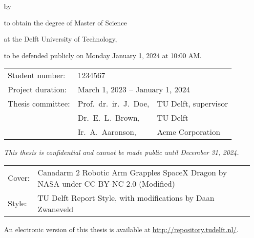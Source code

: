 \begin{titlepage}

\begin{center}

{\makeatletter
\largetitlestyle\fontsize{45}{45}\selectfont\@title
\makeatother}

{\makeatletter
\ifdefvoid{\@subtitle}{}{\bigskip\titlestyle\fontsize{20}{20}\selectfont\@subtitle}
\makeatother}

\bigskip
\bigskip

by

\bigskip
\bigskip

{\makeatletter
\largetitlestyle\fontsize{25}{25}\selectfont\@author
\makeatother}

\bigskip
\bigskip

to obtain the degree of Master of Science

at the Delft University of Technology,

to be defended publicly on Monday January 1, 2024 at 10:00 AM.

\vfill

\begin{tabular}{lll}
    Student number: & 1234567 \\
    Project duration: & \multicolumn{2}{l}{March 1, 2023 -- January 1, 2024} \\
    Thesis committee: & Prof.\ dr.\ ir.\ J.\ Doe, & TU Delft, supervisor \\
        & Dr.\ E.\ L.\ Brown, & TU Delft \\
        & Ir.\ A.\ Aaronson, & Acme Corporation
\end{tabular}

\bigskip
\bigskip
\emph{This thesis is confidential and cannot be made public until December 31, 2024.}

\bigskip
\bigskip
\begin{tabular}{p{15mm}p{10cm}}
    Cover: & Canadarm 2 Robotic Arm Grapples SpaceX Dragon by NASA under CC BY-NC 2.0 (Modified) \\
    Style: & TU Delft Report Style, with modifications by Daan Zwaneveld
\end{tabular}

\bigskip
\bigskip
An electronic version of this thesis is available at \url{http://repository.tudelft.nl/}.

\end{center}


\end{titlepage}
